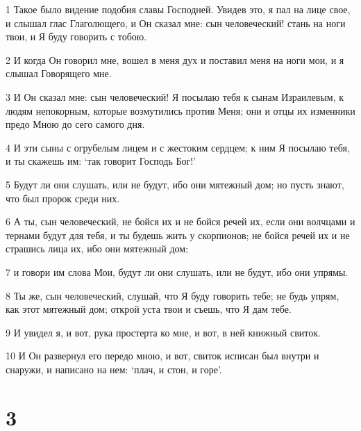 \par 1 Такое было видение подобия славы Господней. Увидев это, я пал на лице свое, и слышал глас Глаголющего, и Он сказал мне: сын человеческий! стань на ноги твои, и Я буду говорить с тобою.
\par 2 И когда Он говорил мне, вошел в меня дух и поставил меня на ноги мои, и я слышал Говорящего мне.
\par 3 И Он сказал мне: сын человеческий! Я посылаю тебя к сынам Израилевым, к людям непокорным, которые возмутились против Меня; они и отцы их изменники предо Мною до сего самого дня.
\par 4 И эти сыны с огрубелым лицем и с жестоким сердцем; к ним Я посылаю тебя, и ты скажешь им: `так говорит Господь Бог!'
\par 5 Будут ли они слушать, или не будут, ибо они мятежный дом; но пусть знают, что был пророк среди них.
\par 6 А ты, сын человеческий, не бойся их и не бойся речей их, если они волчцами и тернами будут для тебя, и ты будешь жить у скорпионов; не бойся речей их и не страшись лица их, ибо они мятежный дом;
\par 7 и говори им слова Мои, будут ли они слушать, или не будут, ибо они упрямы.
\par 8 Ты же, сын человеческий, слушай, что Я буду говорить тебе; не будь упрям, как этот мятежный дом; открой уста твои и съешь, что Я дам тебе.
\par 9 И увидел я, и вот, рука простерта ко мне, и вот, в ней книжный свиток.
\par 10 И Он развернул его передо мною, и вот, свиток исписан был внутри и снаружи, и написано на нем: `плач, и стон, и горе'.

\chapter{3}

